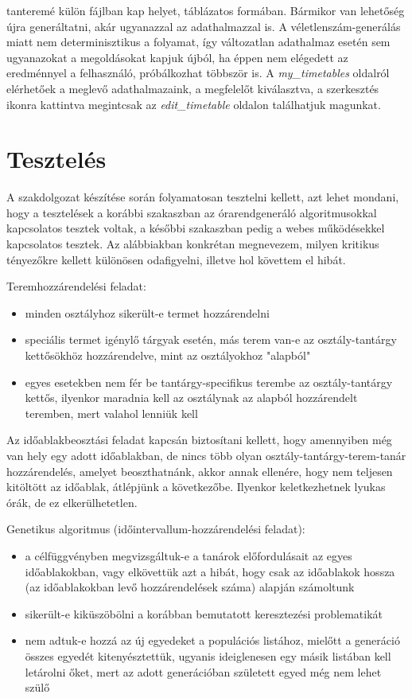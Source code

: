 tanteremé külön fájlban kap helyet, táblázatos formában. Bármikor van lehetőség újra generáltatni, akár ugyanazzal az adathalmazzal is. A véletlenszám-generálás miatt nem determinisztikus a folyamat, így változatlan adathalmaz esetén sem ugyanazokat a megoldásokat kapjuk újból, ha éppen nem elégedett az eredménnyel a felhasználó, próbálkozhat többször is. A \textit{my\_timetables} oldalról elérhetőek a meglevő adathalmazaink, a megfelelőt kiválasztva, a szerkesztés ikonra kattintva megintcsak az \textit{edit\_timetable} oldalon találhatjuk magunkat.

\section{Tesztelés}

A szakdolgozat készítése során folyamatosan tesztelni kellett, azt lehet mondani, hogy a tesztelések a korábbi szakaszban az órarendgeneráló algoritmusokkal kapcsolatos tesztek voltak, a későbbi szakaszban pedig a webes működésekkel kapcsolatos tesztek. Az alábbiakban konkrétan megnevezem, milyen kritikus tényezőkre kellett különösen odafigyelni, illetve hol követtem el hibát.

Teremhozzárendelési feladat:
\begin{itemize}
\item minden osztályhoz sikerült-e termet hozzárendelni
\item speciális termet igénylő tárgyak esetén, más terem van-e az osztály-tantárgy kettősökhöz hozzárendelve, mint az osztályokhoz "alapból"
\item egyes esetekben nem fér be tantárgy-specifikus terembe az osztály-tantárgy kettős, ilyenkor maradnia kell az osztálynak az alapból hozzárendelt teremben, mert valahol lenniük kell
\end{itemize}

Az időablakbeosztási feladat kapcsán biztosítani kellett, hogy amennyiben még van hely egy adott időablakban, de nincs több olyan osztály-tantárgy-terem-tanár hozzárendelés, amelyet  beoszthatnánk, akkor annak ellenére, hogy nem teljesen kitöltött az időablak, átlépjünk a következőbe. Ilyenkor keletkezhetnek lyukas órák, de ez elkerülhetetlen.

Genetikus algoritmus (időintervallum-hozzárendelési feladat):
\begin{itemize}
\item a célfüggvényben megvizsgáltuk-e a tanárok előfordulásait az egyes időablakokban, vagy elkövettük azt a hibát, hogy csak az időablakok hossza (az időablakokban levő hozzárendelések száma) alapján számoltunk
\item sikerült-e kiküszöbölni a korábban bemutatott keresztezési problematikát
\item nem adtuk-e hozzá az új egyedeket a populációs listához, mielőtt a generáció összes egyedét kitenyésztettük, ugyanis ideiglenesen egy másik listában kell letárolni őket, mert az adott generációban született egyed még nem lehet szülő
\end{itemize}

